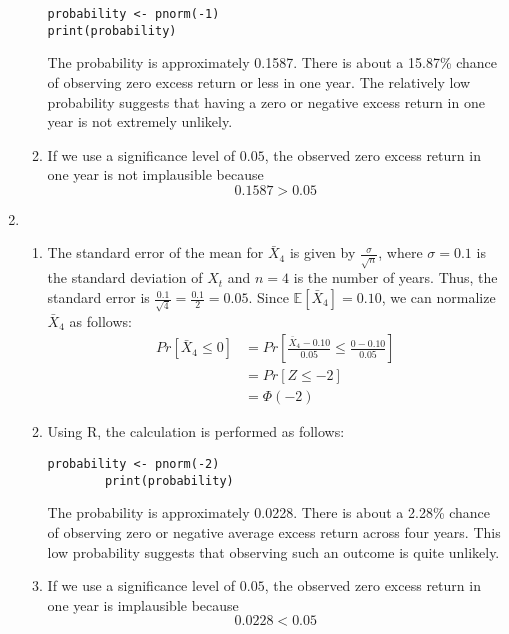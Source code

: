 \documentclass[10pt]{article}
\newcommand{\E}{\mathbb{E}}
\newenvironment{problem}[2][Problem]{\begin{trivlist}
\item[\hskip \labelsep {\bfseries #1}\hskip \labelsep {\bfseries #2.}]}{\end{trivlist}}
\begin{document}
\begin{problem}{5}
\begin{enumerate}
\begin{enumerate}
                    \begin{lstlisting}[style=Rstyle]
probability <- pnorm(-1)
print(probability)
                \end{lstlisting}
                    The probability is approximately 0.1587. There is about a 15.87\% chance of observing zero excess return or less in one year. The relatively low probability suggests that having a zero or negative excess return in one year is not extremely unlikely.
                \item 
                    If we use a significance level of $0.05$, the observed zero excess return in one year is not implausible because 
                    \[0.1587 > 0.05\]
            \end{enumerate}
        \item \hfill
                \begin{enumerate}
                    \item The standard error of the mean for $\bar{X}_4$ is given by $\frac{\sigma}{\sqrt{n}}$, where $\sigma = 0.1$ is the standard deviation of $X_t$ and $n = 4$ is the number of years. Thus, the standard error is $\frac{0.1}{\sqrt{4}} = \frac{0.1}{2} = 0.05$. Since $\E[\bar{X}_4] = 0.10$, we can normalize $\bar{X}_4$ as follows:
                        \begin{align*}
                            Pr[\bar{X}_4 \leq 0] &= Pr\left[\frac{\bar{X}_4 - 0.10}{0.05} \leq \frac{0 - 0.10}{0.05}\right] \\
                            &= Pr[Z \leq -2] \\
                            &= \Phi(-2)
                        \end{align*}
                    \item Using R, the calculation is performed as follows:
                        \begin{lstlisting}[style=Rstyle]
        probability <- pnorm(-2)
        print(probability)
                        \end{lstlisting}
                        The probability is approximately 0.0228. There is about a 2.28\% chance of observing zero or negative average excess return across four years. This low probability suggests that observing such an outcome is quite unlikely.
                    \item 
                    If we use a significance level of $0.05$, the observed zero excess return in one year is implausible because 
                    \[0.0228 < 0.05\]
                \end{enumerate}


\end{enumerate}
\end{problem}
\end{document}
